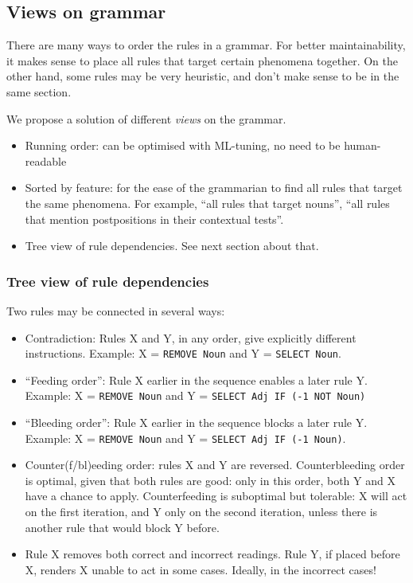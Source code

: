 \documentclass[11pt]{article}
\def\t#1{\texttt{#1}}
\begin{document}
\subsection{Views on grammar}

There are many ways to order the rules in a grammar. For better maintainability, 
it makes sense to place all rules that target certain phenomena together.
On the other hand, some rules may be very heuristic, and don't make sense to be in the same section.

We propose a solution of different \emph{views} on the grammar.
\begin{itemize}
\item Running order: can be optimised with ML-tuning, no need to be human-readable
\item Sorted by feature: for the ease of the grammarian to find all rules that target the same phenomena.
For example, ``all rules that target nouns'', ``all rules that mention postpositions in their contextual tests''.
\item Tree view of rule dependencies. See next section about that.
\end{itemize}



\subsubsection{Tree view of rule dependencies}

Two rules may be connected in several ways:

\begin{itemize}
\item Contradiction: Rules X and Y, in any order, give explicitly different instructions. Example: X = \t{REMOVE Noun} and Y = \t{SELECT Noun}.
\item ``Feeding order'': Rule X earlier in the sequence enables a later rule Y. Example: X = \t{REMOVE Noun} and Y = \t{SELECT Adj IF (-1 NOT Noun)}
\item ``Bleeding order'': Rule X earlier in the sequence blocks a later rule Y. Example:  X = \t{REMOVE Noun} and Y = \t{SELECT Adj IF (-1 Noun)}.
\item Counter(f/bl)eeding order: rules X and Y are reversed. Counterbleeding order is optimal, given that both rules are good: only in this order, both Y and X have a chance to apply. Counterfeeding is suboptimal but tolerable: X will act on the first iteration, and Y only on the second iteration, unless there is another rule that would block Y before.
\item Rule X removes both correct and incorrect readings. Rule Y, if placed before X, renders X unable to act in some cases. Ideally, in the incorrect cases!
\end{itemize}
\end{document}
